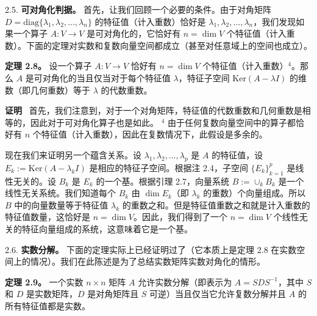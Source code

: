 2.5. \textbf{可对角化判据。} 首先，让我们回顾一个必要的条件。由于对角矩阵 $D = \text{diag}\{\lambda_1, \lambda_2, \dots, \lambda_n\}$ 的特征值（计入重数）恰好是 $\lambda_1, \lambda_2, \dots, \lambda_n$，我们发现如果一个算子 $A: V \to V$ 是可对角化的，它恰好有 $n = \dim V$ 个特征值（计入重数）。下面的定理对实数和复数向量空间都成立（甚至对任意域上的空间也成立）。

\textbf{定理 2.8。} 设一个算子 $A: V \to V$ 恰好有 $n = \dim V$ 个特征值（计入重数）$^4$。那么 $A$ 是可对角化的当且仅当对于每个特征值 $\lambda$，特征子空间 $\text{Ker}(A - \lambda I)$ 的维数（即几何重数）等于 $\lambda$ 的代数重数。

\textbf{证明}~ 首先，我们注意到，对于一个对角矩阵，特征值的代数重数和几何重数是相等的，因此对于可对角化算子也是如此。
$^4$ 由于任何复数向量空间中的算子都恰好有 $n$ 个特征值（计入重数），因此在复数情况下，此假设是多余的。


现在我们来证明另一个蕴含关系。设 $\lambda_1, \lambda_2, \dots, \lambda_p$ 是 $A$ 的特征值，设 $E_k := \text{Ker}(A - \lambda_k I)$ 是相应的特征子空间。根据注 2.4，子空间 $\{E_k\}_{k=1}^p$ 是线性无关的。设 $B_k$ 是 $E_k$ 的一个基。根据引理 2.7，向量系统 $B := \cup_k B_k$ 是一个线性无关系统。我们知道每个 $B_k$ 由 $\dim E_k$（即 $\lambda_k$ 的重数）个向量组成。所以 $B$ 中的向量数量等于特征值 $\lambda_k$ 的重数之和。但是特征值重数之和就是计入重数的特征值数量，这恰好是 $n = \dim V$。因此，我们得到了一个 $n = \dim V$ 个线性无关的特征向量组成的系统，这意味着它是一个基。

2.6. \textbf{实数分解。} 下面的定理实际上已经证明过了（它本质上是定理 2.8 在实数空间上的情况）。我们在此陈述是为了总结实数矩阵实数对角化的情形。

\textbf{定理 2.9。} 一个实数 $n \times n$ 矩阵 $A$ 允许实数分解（即表示为 $A = SDS^{-1}$，其中 $S$ 和 $D$ 是实数矩阵，$D$ 是对角矩阵且 $S$ 可逆）当且仅当它允许复数分解并且 $A$ 的所有特征值都是实数。

